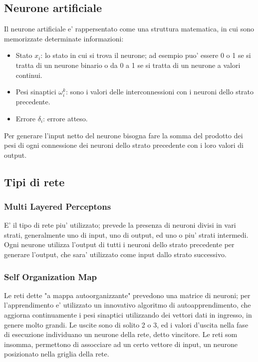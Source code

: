 \documentclass[a4paper,10pt]{report}
\begin{document}
\subsection{Neurone artificiale}
Il neurone artificiale e' rappersentato come una struttura matematica, in cui
sono memorizzate determinate informazioni:
\begin{itemize}
\item Stato $ x_i $: lo stato in cui si trova il neurone; ad esempio 
puo' essere 0 o 1 se si tratta
di un neurone binario o da 0 a 1 se si tratta di un neurone a  valori continui.
\item Pesi sinaptici $ \omega_i^k $: sono i valori delle interconnessioni con i neuroni 
dello strato precedente.
\item Errore $ \delta_i $: errore atteso.
\end{itemize}

Per generare l'input netto del neurone bisogna fare la somma del prodotto
dei pesi di ogni connessione dei neuroni dello strato precedente con i loro
valori di output.


\subsection{Tipi di rete}
\subsubsection{Multi Layered Perceptons}
E' il tipo di rete piu' utilizzato; prevede la presenza di neuroni 
divisi in vari strati, generalmente uno di input, uno di output, ed uno
o piu' strati intermedi. Ogni neurone utilizza l'output di tutti i neuroni
dello strato precedente per generare l'output, che sara' utilizzato come
input dallo strato successivo. 

\subsubsection{Self Organization Map}
Le reti dette "a mappa autoorganizzante" prevedono una matrice di neuroni;
per l'apprendimento e' utilizzato un innovativo algoritmo di autoapprendimento,
che aggiorna continuamente i pesi sinaptici utilizzando dei vettori dati
in ingresso, in genere molto grandi. Le uscite sono di solito 2 o 3, ed i 
valori d'uscita nella fase di esecuzione individuano un neurone
della rete, detto vincitore. Le reti som insomma, permettono di assocciare
ad un certo vettore di input, un neurone posizionato nella griglia della rete.
\end{document}
